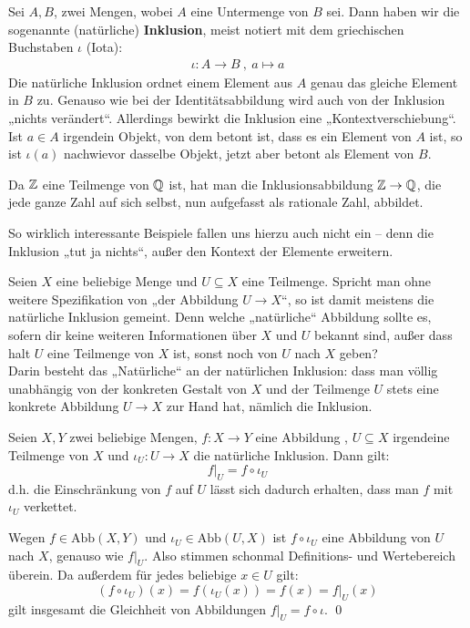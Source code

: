 \begin{de}[Inklusionsabbildung]
	Sei $A,B$, zwei Mengen, wobei $A$ eine Untermenge von $B$ sei. Dann haben wir die sogenannte (natürliche) \textbf{Inklusion}, meist notiert mit dem griechischen Buchstaben $\iota$ (Iota):
	\begin{align*}
		\iota: A \to B \ ,\ a \mapsto a
	\end{align*}
Die natürliche Inklusion ordnet einem Element aus $A$ genau das gleiche Element in $B$ zu. Genauso wie bei der Identitätsabbildung wird auch von der Inklusion „nichts verändert“. Allerdings bewirkt die Inklusion eine „Kontextverschiebung“. Ist $a\in A$ irgendein Objekt, von dem betont ist, dass es ein Element von $A$ ist, so ist $\iota(a)$ nachwievor dasselbe Objekt, jetzt aber betont als Element von $B$.
\end{de}



\begin{bsp}
 Da ${\mathbb Z}$ eine Teilmenge von ${\mathbb Q}$ ist, hat man die Inklusionsabbildung ${\mathbb Z} \to {\mathbb Q}$, die jede ganze Zahl auf sich selbst, nun aufgefasst als rationale Zahl, abbildet.
\end{bsp}
So wirklich interessante Beispiele fallen uns hierzu auch nicht ein -- denn die Inklusion „tut ja nichts“, außer den Kontext der Elemente erweitern.





\begin{bem}
 Seien $X$ eine beliebige Menge und $U\subseteq X$ eine Teilmenge. Spricht man ohne weitere Spezifikation von „der Abbildung $U\to X$“, so ist damit meistens die natürliche Inklusion gemeint. Denn welche „natürliche“ Abbildung sollte es, sofern dir keine weiteren Informationen über $X$ und $U$ bekannt sind, außer dass halt $U$ eine Teilmenge von $X$ ist, sonst noch von $U$ nach $X$ geben? \\
 Darin besteht das „Natürliche“ an der natürlichen Inklusion: dass man völlig unabhängig von der konkreten Gestalt von $X$ und der Teilmenge $U$ stets eine konkrete Abbildung $U\to X$ zur Hand hat, nämlich die Inklusion.
\end{bem}




\begin{sat}
 Seien $X,Y$ zwei beliebige Mengen, $f:X\to Y$ eine Abbildung , $U\subseteq X$ irgendeine Teilmenge von $X$ und $\iota_U : U\to X$ die natürliche Inklusion. Dann gilt:
 \[ f\vert_U = f\circ \iota_U \]
 d.h. die Einschränkung von $f$ auf $U$ lässt sich dadurch erhalten, dass man $f$ mit $\iota_U$ verkettet.
\end{sat}
\begin{bew}
 Wegen $f\in \text{Abb}(X,Y)$ und $\iota_U \in \text{Abb}(U,X)$ ist $f\circ \iota_U$ eine Abbildung von $U$ nach $X$, genauso wie $f\vert_U$. Also stimmen schonmal Definitions- und Wertebereich überein. Da außerdem für jedes beliebige $x\in U$ gilt:
 \[ (f\circ \iota_U)(x) = f(\iota_U(x)) = f(x) = f\vert_U(x) \]
 gilt insgesamt die Gleichheit von Abbildungen $f\vert_U = f\circ \iota$. \qed
\end{bew}



